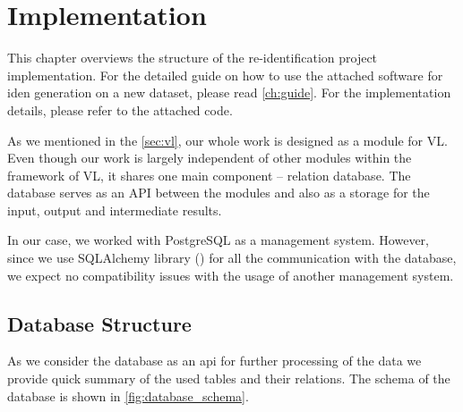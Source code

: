 \chapter{Implementation}

\label{ch:implementation}

This chapter overviews the structure of the re-identification project implementation. For the detailed guide on how to use the attached software for \gls{iden} generation on a new dataset, please read \autoref{ch:guide}. For the implementation details, please refer to the attached code.

As we mentioned in the \autoref{sec:vl}, our whole work is designed as a module for \gls{VL}. Even though our work is largely independent of other modules within the framework of \gls{VL}, it shares one main component -- relation database. The database serves as an API between the modules and also as a storage for the input, output and intermediate results.

In our case, we worked with PostgreSQL as a management system. However, since we use SQLAlchemy library (\cite{sqlalchemy}) for all the communication with the database, we expect no compatibility issues with the usage of another management system.

\section{Database Structure}

As we consider the database as an \gls{api} for further processing of the data we provide quick summary of the used tables and their relations. The schema of the database is shown in \autoref{fig:database_schema}.


